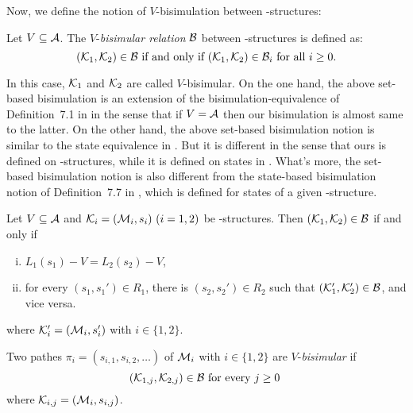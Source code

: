 \documentclass{article}
\begin{document}
Now, we define the notion of $V$-bisimulation between \MPK-structures:
\begin{definition}[$V$-bisimulation]
  \label{def:V-bisimulation}
   Let $V\subseteq\cal A$. The $V$-{\em bisimular relation} ${\cal B}$ between
   \MPK-structures is defined as:
  \[({\cal K}_1,{\cal K}_2)\in {\cal B}\mbox{ if and only if } ({\cal K}_1,{\cal K}_2)\in {{\cal B}_i}\mbox{ for all }i\ge 0.\]
\end{definition}
In this case, ${\cal K}_1$ and ${\cal K}_2$ are called $V$-bisimular.
On the one hand, the above set-based bisimulation is an extension of the
bisimulation-equivalence of Definition~7.1 in \cite{Baier:PMC:2008} in the
sense that if $V=\cal A$ then our bisimulation is almost same to the
latter.
On the other hand, the above set-based bisimulation notion is similar to
the state equivalence in \cite{DBLP:journals/tcs/BrowneCG88}. But it is
different in the sense that ours is defined on \MPK-structures,
while it is defined on states in \cite{DBLP:journals/tcs/BrowneCG88}.
What's more, the set-based bisimulation notion is also different
from  the state-based bisimulation notion of Definition~7.7 in \cite{Baier:PMC:2008},
which is defined for states of a given \MPK-structure.
\begin{proposition}\label{Vbi:Equ}
Let $V\subseteq\cal A$
and ${\cal K}_i=({\cal M}_i,s_i)~(i=1,2)$ be \MPK-structures.
Then $({\cal K}_1,{\cal K}_2)\in\cal B$ if and only if
  \begin{enumerate}[(i)]
    \item $L_1(s_1)- V = L_2(s_2)-V$,
    \item for every $(s_1,s_1')\in R_1$, there is $(s_2,s_2')\in R_2$
    such that $({\cal K}_1',{\cal K}_2')\in {\cal B}$, and vice versa.
   \end{enumerate}
 where ${\cal K}_i'=({\cal M}_i,s_i')$ with $i\in\{1,2\}$.
\end{proposition}

Two pathes $\pi_i=(s_{i,1},s_{i,2},\ldots)$ of ${\cal M}_i$ with $i\in \{1,2\}$
 are $V$-{\em bisimular} if
 \[({\cal K}_{1,j},{\cal K}_{2,j})\in {\cal B} \mbox { for every $j\ge 0$ }\]
 where ${\cal K}_{i,j}=({\cal M}_i,s_{i,j})$.
\end{document}
